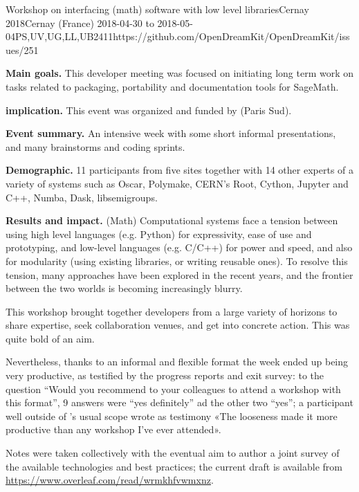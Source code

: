 \begin{event}{Workshop on interfacing (math) software with low level libraries}{Cernay 2018}{Cernay (France) 2018-04-30 to 2018-05-04}{PS,UV,UG,LL,UB}{24}{11}{https://github.com/OpenDreamKit/OpenDreamKit/issues/251}

  \textbf{Main goals.} This developer meeting was focused on
  initiating long term work on \ODK tasks related to packaging,
  portability and documentation tools for SageMath.

  \textbf{\ODK implication.} This event was organized and funded by
  \ODK (Paris Sud).

  \textbf{Event summary.} An intensive week with some short informal
  presentations, and many brainstorms and coding sprints.

  \textbf{Demographic.} 11 \ODK participants from five sites together
  with 14 other experts of a variety of systems such as Oscar,
  Polymake, CERN's Root, Cython, Jupyter and C++, Numba, Dask,
  libsemigroups.

  \textbf{Results and impact.} (Math) Computational systems face a
  tension between using high level languages (e.g. Python) for
  expressivity, ease of use and prototyping, and low-level languages
  (e.g. C/C++) for power and speed, and also for modularity (using
  existing libraries, or writing reusable ones). To resolve this
  tension, many approaches have been explored in the recent years, and
  the frontier between the two worlds is becoming increasingly blurry.

  This workshop brought together developers from a large variety of
  horizons to share expertise, seek collaboration venues, and get into
  concrete action. This was quite bold of an aim.

  Nevertheless, thanks to an informal and flexible format the week
  ended up being very productive, as testified by the progress reports
  and exit survey: to the question “Would you recommend to your
  colleagues to attend a workshop with this format”, 9 answers were
  ``yes definitely'' ad the other two ``yes''; a participant well
  outside of \ODK's usual scope wrote as testimony «The looseness made
  it more productive than any workshop I've ever attended».

  Notes were taken collectively with the eventual aim to author a
  joint survey of the available technologies and best practices; the
  current draft is available from
  \url{https://www.overleaf.com/read/wrmkhfvwmxnz}.


\end{event}
